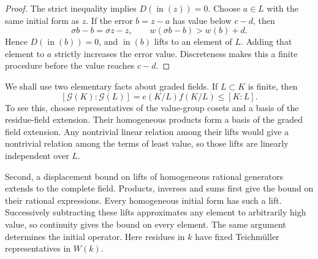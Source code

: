 \begin{proof}
The strict inequality implies $D(\operatorname{in}(z))=0$. Choose $a\in L$ with the same initial form as $z$. If the error $b=z-a$ has value below $c-d$, then
\[
 \sigma b-b=\sigma z-z,
 \qquad w(\sigma b-b)>w(b)+d.
\]
Hence $D(\operatorname{in}(b))=0$, and $\operatorname{in}(b)$ lifts to an element of $L$. Adding that element to $a$ strictly increases the error value. Discreteness makes this a finite procedure before the value reaches $c-d$.
\end{proof}

We shall use two elementary facts about graded fields. If $L\subset K$ is finite, then
\begin{equation}\label{eq:divisorial-graded-inequality}
 [\mathcal G(K):\mathcal G(L)]
      =e(K/L)f(K/L)\le [K:L].
\end{equation}
To see this, choose representatives of the value-group cosets and a basis of the residue-field extension. Their homogeneous products form a basis of the graded field extension. Any nontrivial linear relation among their lifts would give a nontrivial relation among the terms of least value, so those lifts are linearly independent over $L$.

Second, a displacement bound on lifts of homogeneous rational generators extends to the complete field. Products, inverses and sums first give the bound on their rational expressions. Every homogeneous initial form has such a lift. Successively subtracting these lifts approximates any element to arbitrarily high value, so continuity gives the bound on every element. The same argument determines the initial operator. Here residues in $k$ have fixed Teichm\"uller representatives in $W(k)$.

